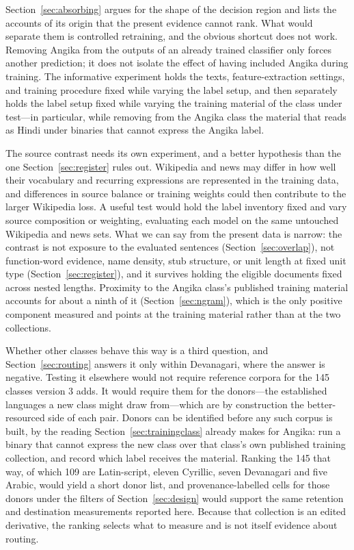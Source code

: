 \documentclass[final]{clv2025}
\begin{document}
Section~\ref{sec:absorbing} argues for the shape of the decision region and lists the accounts of its origin that the present evidence cannot rank. What would separate them is controlled retraining, and the obvious shortcut does not work. Removing Angika from the outputs of an already trained classifier only forces another prediction; it does not isolate the effect of having included Angika during training. The informative experiment holds the texts, feature-extraction settings, and training procedure fixed while varying the label setup, and then separately holds the label setup fixed while varying the training material of the class under test---in particular, while removing from the Angika class the material that reads as Hindi under binaries that cannot express the Angika label.

The source contrast needs its own experiment, and a better hypothesis than the one Section~\ref{sec:register} rules out. Wikipedia and news may differ in how well their vocabulary and recurring expressions are represented in the training data, and differences in source balance or training weights could then contribute to the larger Wikipedia loss. A useful test would hold the label inventory fixed and vary source composition or weighting, evaluating each model on the same untouched Wikipedia and news sets. What we can say from the present data is narrow: the contrast is not exposure to the evaluated sentences (Section~\ref{sec:overlap}), not function-word evidence, name density, stub structure, or unit length at fixed unit type (Section~\ref{sec:register}), and it survives holding the eligible documents fixed across nested lengths. Proximity to the Angika class's published training material accounts for about a ninth of it (Section~\ref{sec:ngram}), which is the only positive component measured and points at the training material rather than at the two collections.

Whether other classes behave this way is a third question, and Section~\ref{sec:routing} answers it only within Devanagari, where the answer is negative. Testing it elsewhere would not require reference corpora for the 145 classes version 3 adds. It would require them for the donors---the established languages a new class might draw from---which are by construction the better-resourced side of each pair. Donors can be identified before any such corpus is built, by the reading Section~\ref{sec:trainingclass} already makes for Angika: run a binary that cannot express the new class over that class's own published training collection, and record which label receives the material. Ranking the 145 that way, of which 109 are Latin-script, eleven Cyrillic, seven Devanagari and five Arabic, would yield a short donor list, and provenance-labelled cells for those donors under the filters of Section~\ref{sec:design} would support the same retention and destination measurements reported here. Because that collection is an edited derivative, the ranking selects what to measure and is not itself evidence about routing.
\end{document}
